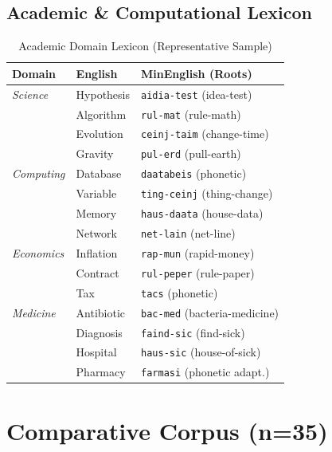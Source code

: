 \documentclass[10pt,onecolumn,letterpaper]{article}
\newcommand{\me}[1]{\texttt{#1}}
\begin{document}
\subsection{Academic \& Computational Lexicon}

\begin{table}[h!]
\centering\small
\begin{tabularx}{\linewidth}{llX}
\toprule
\textbf{Domain} & \textbf{English} & \textbf{MinEnglish (Roots)} \\
\midrule
\textit{Science}    & Hypothesis  & \me{aidia-test} (idea-test) \\
                    & Algorithm   & \me{rul-mat} (rule-math) \\
                    & Evolution   & \me{ceinj-taim} (change-time) \\
                    & Gravity     & \me{pul-erd} (pull-earth) \\
\midrule
\textit{Computing}  & Database    & \me{daatabeis} (phonetic) \\
                    & Variable    & \me{ting-ceinj} (thing-change) \\
                    & Memory      & \me{haus-daata} (house-data) \\
                    & Network     & \me{net-lain} (net-line) \\
\midrule
\textit{Economics}  & Inflation   & \me{rap-mun} (rapid-money) \\
                    & Contract    & \me{rul-peper} (rule-paper) \\
                    & Tax         & \me{tacs} (phonetic) \\
\midrule
\textit{Medicine}   & Antibiotic  & \me{bac-med} (bacteria-medicine) \\
                    & Diagnosis   & \me{faind-sic} (find-sick) \\
                    & Hospital    & \me{haus-sic} (house-of-sick) \\
                    & Pharmacy    & \me{farmasi} (phonetic adapt.) \\
\bottomrule
\end{tabularx}
\caption{Academic Domain Lexicon (Representative Sample)}
\end{table}

\section{Comparative Corpus (n=35)}
\end{document}
